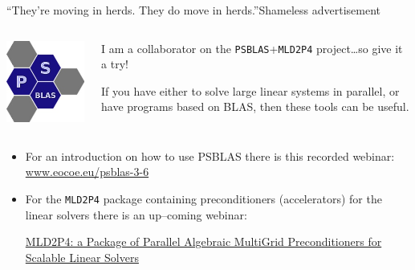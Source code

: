 \documentclass[xcolor={svgnames,usenames}]{beamer}
\begin{document}
\begin{frame}{``They're moving in herds. They do move in herds.''}{Shameless advertisement}

\begin{columns}
\begin{column}{0.3\textwidth}
\centering
\includegraphics[width=0.8\columnwidth]{PSBLASLOGO.jpeg}
\end{column}
\begin{column}{0.7\textwidth}
I am a collaborator on the \texttt{PSBLAS}+\texttt{MLD2P4} project\ldots so give it a try! 

\vfill
If you have either to solve large linear systems in parallel,
or have programs based on BLAS, then these tools can be useful.
\end{column}
\end{columns}

\begin{itemize}
	\item For an introduction on  how to use PSBLAS there is this recorded webinar: \href{https://www.eocoe.eu/video_resource/psblas-3-6-sparse-matrices-computation-iterative-solvers-for-hpc-january-20th-2020/}{www.eocoe.eu/psblas-3-6}
	\item For the \texttt{MLD2P4} package containing preconditioners (accelerators) for the linear solvers there is an up--coming webinar:
	\begin{center}
	\href{https://attendee.gotowebinar.com/register/3291194948253656589}{MLD2P4: a Package of Parallel Algebraic MultiGrid Preconditioners for Scalable Linear Solvers}
	\end{center}
\end{itemize}

\end{frame}
\end{document}
